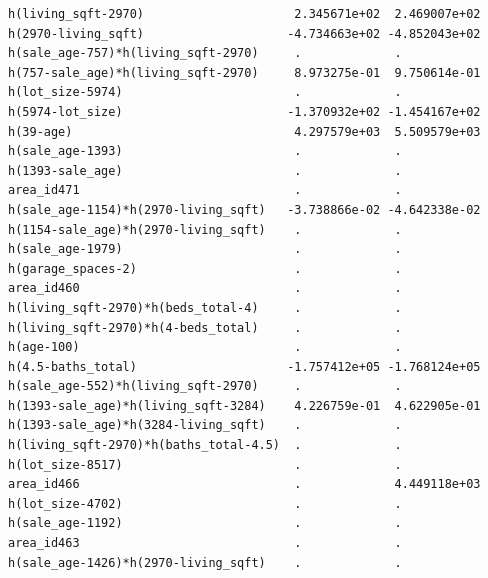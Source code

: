\documentclass[
]{article}
\begin{document}
\begin{verbatim}
h(living_sqft-2970)                     2.345671e+02  2.469007e+02
h(2970-living_sqft)                    -4.734663e+02 -4.852043e+02
h(sale_age-757)*h(living_sqft-2970)     .             .           
h(757-sale_age)*h(living_sqft-2970)     8.973275e-01  9.750614e-01
h(lot_size-5974)                        .             .           
h(5974-lot_size)                       -1.370932e+02 -1.454167e+02
h(39-age)                               4.297579e+03  5.509579e+03
h(sale_age-1393)                        .             .           
h(1393-sale_age)                        .             .           
area_id471                              .             .           
h(sale_age-1154)*h(2970-living_sqft)   -3.738866e-02 -4.642338e-02
h(1154-sale_age)*h(2970-living_sqft)    .             .           
h(sale_age-1979)                        .             .           
h(garage_spaces-2)                      .             .           
area_id460                              .             .           
h(living_sqft-2970)*h(beds_total-4)     .             .           
h(living_sqft-2970)*h(4-beds_total)     .             .           
h(age-100)                              .             .           
h(4.5-baths_total)                     -1.757412e+05 -1.768124e+05
h(sale_age-552)*h(living_sqft-2970)     .             .           
h(1393-sale_age)*h(living_sqft-3284)    4.226759e-01  4.622905e-01
h(1393-sale_age)*h(3284-living_sqft)    .             .           
h(living_sqft-2970)*h(baths_total-4.5)  .             .           
h(lot_size-8517)                        .             .           
area_id466                              .             4.449118e+03
h(lot_size-4702)                        .             .           
h(sale_age-1192)                        .             .           
area_id463                              .             .           
h(sale_age-1426)*h(2970-living_sqft)    .             .           
                                                                  

\end{verbatim}
\end{document}
